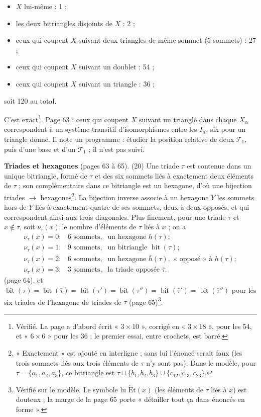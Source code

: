 \documentclass[11pt,a4paper]{article}
\begin{document}
\begin{itemize}
\item $X$ lui-même : 1 ;
\item les deux bitriangles disjoints de $X$ : 2 ;
\item ceux qui coupent $X$ suivant deux triangles de même sommet (5 sommets) :
  27 ;
\item ceux qui coupent $X$ suivant un doublet : 54 ;
\item ceux qui coupent $X$ suivant un triangle : 36 ;
\end{itemize}
soit 120 au total.

C'est exact\footnote{Vérifié. La page a d'abord écrit « $3 \times 10$ », corrigé en
« $3 \times 18$ », pour les 54, et « $6 \times 6$ » pour les 36 ; le premier essai,
entre crochets, est barré.}. Page 63 : ceux qui coupent $X$ suivant un
triangle dans chaque $X_\alpha$ correspondent à un système transitif
d'isomorphismes entre les $I_\alpha$, six pour un triangle donné. Il note un
programme : étudier la position relative de deux $\mathcal{T}_1$, puis d'une
base et d'un $\mathcal{T}_1$ ; il n'est pas suivi.

\textbf{Triades et hexagones} (pages 63 à 65). (20) Une triade $\tau$ est
contenue dans un unique bitriangle, formé de $\tau$ et des six sommets liés à
exactement deux éléments de $\tau$ ; son complémentaire dans ce bitriangle est
un hexagone, d'où une bijection triades $\to$ hexagones\footnote{« Exactement » est
ajouté en interligne ; sans lui l'énoncé serait faux (les trois sommets liés
aux trois éléments de $\tau$ n'y sont pas). Dans le modèle, pour $\tau =
\lbrace a_1, a_2, a_3\rbrace$, ce bitriangle est $\tau \cup \lbrace b_1, b_2,
b_3\rbrace \cup \lbrace c_{12}, c_{13}, c_{23}\rbrace$.}. La bijection inverse associe à un hexagone $Y$ les sommets hors
de $Y$ liés à exactement quatre de ses sommets, deux à deux opposés, et qui
correspondent ainsi aux trois diagonales. Plus finement, pour une triade $\tau$
et $x \notin \tau$, soit $\nu_\tau(x)$ le nombre d'éléments de $\tau$ liés à $x$ ;
on a
\[
\begin{array}{lll}
\nu_\tau(x) = 0 : & 6 \text{ sommets,} & \text{un hexagone } h(\tau) ; \\
\nu_\tau(x) = 1 : & 9 \text{ sommets,} & \text{un bitriangle } \operatorname{bit}(\tau) ; \\
\nu_\tau(x) = 2 : & 6 \text{ sommets,} & \text{un hexagone } \bar h(\tau),
\text{ « opposé » à } h(\tau) ; \\
\nu_\tau(x) = 3 : & 3 \text{ sommets,} & \text{la triade opposée } \bar\tau .
\end{array}
\]
(page 64), et $\operatorname{bit}(\tau) = \operatorname{bit}(\bar\tau) =
\operatorname{bit}(\tau') = \operatorname{bit}(\tau'') = \operatorname{bit}(\bar\tau')
= \operatorname{bit}(\bar\tau'')$ pour les six triades de l'hexagone de triades
de $\tau$ (page 65)\footnote{Vérifié sur le modèle. Le symbole lu
$\mathrm{\acute Et}(x)$ (les éléments de $\tau$ liés à $x$) est douteux ; la marge de
la page 65 porte « détailler tout ça dans énoncés en forme ».}.
\end{document}
